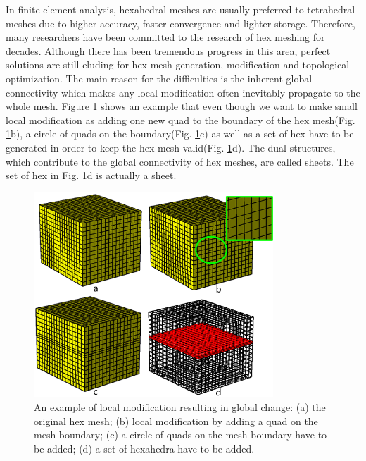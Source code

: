 \documentclass[final,5p,times,twocolumn]{elsarticle}
\begin{document}
In finite element analysis, hexahedral meshes are usually preferred to tetrahedral meshes due to higher accuracy, faster convergence and lighter storage\cite{Shepherd:2007tg,Shepherd:2008dg}. Therefore, many researchers have been committed to the research of hex meshing for decades. Although there has been tremendous progress in this area, perfect solutions are still eluding for hex mesh generation, modification and topological optimization. The main reason for the difficulties is the inherent global connectivity which makes any local modification often inevitably propagate to the whole mesh\cite{Murdoch:1997fy, Tautges:2003vt, Ledoux:2009cg, Ramos:2014jq}. Figure \ref{fig:global_structure} shows an example that even though we want to make small local modification as adding one new quad to the boundary of the hex mesh(Fig. \ref{fig:global_structure}b), a circle of quads on the boundary(Fig. \ref{fig:global_structure}c) as well as a set of hex have to be generated in order to keep the hex mesh valid(Fig. \ref{fig:global_structure}d). The dual structures, which contribute to the global connectivity of hex meshes, are called sheets. The set of hex in Fig. \ref{fig:global_structure}d is actually a sheet.

\begin{figure}[htbp]
\begin{center}
\includegraphics[width=9cm]{rev_figures/global_structure.png}
\caption{An example of local modification resulting in global change: (a) the original hex mesh; (b) local modification by adding a quad on the mesh boundary; (c) a circle of quads on the mesh boundary have to be added; (d) a set of hexahedra have to be added.}
\label{fig:global_structure}
\end{center}
\end{figure}
\end{document}
